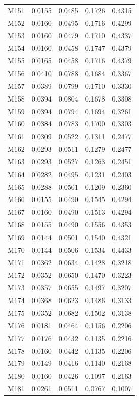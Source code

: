 \begin{longtable}{lrrrr}
M151 & 0.0155 & 0.0485 & 0.1726 & 0.4315 \\
M152 & 0.0160 & 0.0495 & 0.1716 & 0.4299 \\
M153 & 0.0160 & 0.0479 & 0.1710 & 0.4337 \\
M154 & 0.0160 & 0.0458 & 0.1747 & 0.4379 \\
M155 & 0.0165 & 0.0458 & 0.1716 & 0.4379 \\
M156 & 0.0410 & 0.0788 & 0.1684 & 0.3367 \\
M157 & 0.0389 & 0.0799 & 0.1710 & 0.3330 \\
M158 & 0.0394 & 0.0804 & 0.1678 & 0.3308 \\
M159 & 0.0394 & 0.0794 & 0.1694 & 0.3261 \\
M160 & 0.0384 & 0.0783 & 0.1700 & 0.3303 \\
M161 & 0.0309 & 0.0522 & 0.1311 & 0.2477 \\
M162 & 0.0293 & 0.0511 & 0.1279 & 0.2477 \\
M163 & 0.0293 & 0.0527 & 0.1263 & 0.2451 \\
M164 & 0.0282 & 0.0495 & 0.1231 & 0.2403 \\
M165 & 0.0288 & 0.0501 & 0.1209 & 0.2360 \\
M166 & 0.0155 & 0.0490 & 0.1545 & 0.4294 \\
M167 & 0.0160 & 0.0490 & 0.1513 & 0.4294 \\
M168 & 0.0155 & 0.0490 & 0.1556 & 0.4353 \\
M169 & 0.0144 & 0.0501 & 0.1540 & 0.4321 \\
M170 & 0.0144 & 0.0506 & 0.1534 & 0.4433 \\
M171 & 0.0362 & 0.0634 & 0.1428 & 0.3218 \\
M172 & 0.0352 & 0.0650 & 0.1470 & 0.3223 \\
M173 & 0.0357 & 0.0655 & 0.1497 & 0.3207 \\
M174 & 0.0368 & 0.0623 & 0.1486 & 0.3133 \\
M175 & 0.0352 & 0.0682 & 0.1502 & 0.3138 \\
M176 & 0.0181 & 0.0464 & 0.1156 & 0.2206 \\
M177 & 0.0176 & 0.0432 & 0.1135 & 0.2216 \\
M178 & 0.0160 & 0.0442 & 0.1135 & 0.2206 \\
M179 & 0.0149 & 0.0416 & 0.1140 & 0.2168 \\
M180 & 0.0160 & 0.0426 & 0.1097 & 0.2163 \\
M181 & 0.0261 & 0.0511 & 0.0767 & 0.1007 \\

\end{longtable}
